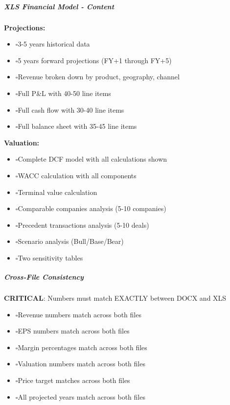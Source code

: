 \documentclass[11pt]{article}
\newcommand{\UncheckedBox}{$\square$}
\begin{document}
\subparagraph{XLS Financial Model - Content}\mbox{}\par

\textbf{Projections:}

\begin{itemize}[leftmargin=*,itemsep=2pt,topsep=2pt]
\item {} \UncheckedBox 3-5 years historical data
\item {} \UncheckedBox 5 years forward projections (FY+1 through FY+5)
\item {} \UncheckedBox Revenue broken down by product, geography, channel
\item {} \UncheckedBox Full P\&L with 40-50 line items
\item {} \UncheckedBox Full cash flow with 30-40 line items
\item {} \UncheckedBox Full balance sheet with 35-45 line items
\end{itemize}

\textbf{Valuation:}

\begin{itemize}[leftmargin=*,itemsep=2pt,topsep=2pt]
\item {} \UncheckedBox Complete DCF model with all calculations shown
\item {} \UncheckedBox WACC calculation with all components
\item {} \UncheckedBox Terminal value calculation
\item {} \UncheckedBox Comparable companies analysis (5-10 companies)
\item {} \UncheckedBox Precedent transactions analysis (5-10 deals)
\item {} \UncheckedBox Scenario analysis (Bull/Base/Bear)
\item {} \UncheckedBox Two sensitivity tables
\end{itemize}

\subparagraph{Cross-File Consistency}\mbox{}\par

\textbf{CRITICAL}: Numbers must match EXACTLY between DOCX and XLS


\begin{itemize}[leftmargin=*,itemsep=2pt,topsep=2pt]
\item {} \UncheckedBox Revenue numbers match across both files
\item {} \UncheckedBox EPS numbers match across both files
\item {} \UncheckedBox Margin percentages match across both files
\item {} \UncheckedBox Valuation numbers match across both files
\item {} \UncheckedBox Price target matches across both files
\item {} \UncheckedBox All projected years match across both files
\end{itemize}
\end{document}
